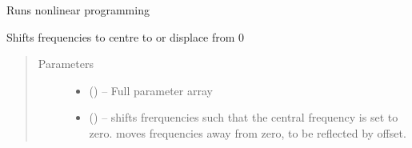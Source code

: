 \documentclass[letterpaper,10pt,english]{sphinxmanual}
\begin{document}
\begin{fulllineitems}

\begin{fulllineitems}
\label{\detokenize{references/nlp/nlp:nmrespy.nlp.nlp.NonlinearProgramming._run_nlp}}
\sphinxAtStartPar
Runs nonlinear programming

\end{fulllineitems}


\begin{fulllineitems}
\label{\detokenize{references/nlp/nlp:nmrespy.nlp.nlp.NonlinearProgramming._shift_offset}}
\sphinxAtStartPar
Shifts frequencies to centre to or displace from 0
\begin{quote}\begin{description}
\item[{Parameters}] \leavevmode\begin{itemize}
\item {} 
\sphinxAtStartPar
{} () – Full parameter array

\item {} 
\sphinxAtStartPar
{} () –  shifts frerquencies such that the central frequency
is set to zero.  moves frequencies away from zero,
to be reflected by offset.

\end{itemize}

\end{description}\end{quote}

\end{fulllineitems}



\end{fulllineitems}
\end{document}
